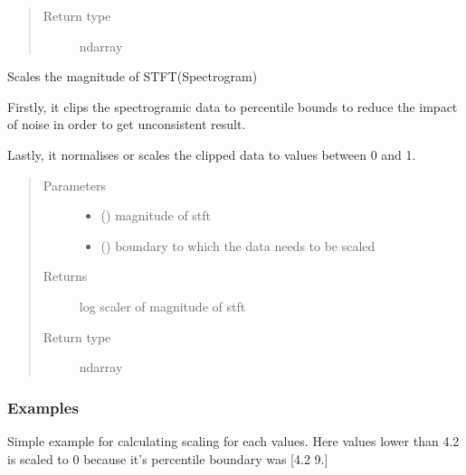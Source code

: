 \documentclass[letterpaper,10pt,english]{sphinxmanual}
\begin{document}
\begin{fulllineitems}
\begin{fulllineitems}
\begin{quote}
\begin{description}
\item[{Return type}] \leavevmode
ndarray

\end{description}\end{quote}

\end{fulllineitems}


\begin{fulllineitems}
\label{\detokenize{docs/source/preprocess:preprocess.preprocess_tools.Scaler.scale}}
Scales the magnitude of STFT(Spectrogram)

Firstly, it clips the spectrogramic data to percentile bounds
to reduce the impact of noise in order to get unconsistent result.

Lastly, it normalises or scales the clipped data to values between 0 and 1.
\begin{quote}\begin{description}
\item[{Parameters}] \leavevmode\begin{itemize}
\item {} 
 () \textendash{} magnitude of stft

\item {} 
 () \textendash{} boundary to which the data needs to be scaled

\end{itemize}

\item[{Returns}] \leavevmode
{} \textendash{} log scaler of magnitude of stft

\item[{Return type}] \leavevmode
ndarray

\end{description}\end{quote}
\subsubsection*{Examples}

Simple example for calculating scaling for each values.
Here values lower than 4.2 is scaled to 0 because it’s percentile
boundary was {[}4.2 9.{]}


\end{fulllineitems}
\end{fulllineitems}
\end{document}
